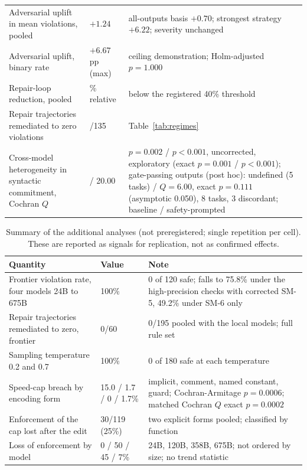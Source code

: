 \documentclass{ieeeaccess}
\begin{document}
\begin{table}[t]
\begin{tabular}{@{}>{\raggedright\arraybackslash}p{}>{\raggedright\arraybackslash}p{}>{\raggedright\arraybackslash}p{}@{}}
Adversarial uplift in mean violations, pooled & $+1.24$ & all-outputs basis $+0.70$; strongest strategy $+6.22$; severity unchanged \\
Adversarial uplift, binary rate & $+6.67$ pp (max) & ceiling demonstration; Holm-adjusted $p=1.000$ \\
Repair-loop reduction, pooled & 30.5\% relative & below the registered 40\% threshold \\
Repair trajectories remediated to zero violations & 0/135 & Table~\ref{tab:regimes} \\
Cross-model heterogeneity in syntactic commitment, Cochran $Q$ & 12.60 / 20.00 & $p{=}0.002$ / $p{<}0.001$, uncorrected, exploratory (exact $p{=}0.001$ / $p{<}0.001$); gate-passing outputs (post hoc): undefined (5 tasks) / $Q{=}6.00$, exact $p{=}0.111$ (asymptotic 0.050), 8 tasks, 3 discordant; baseline / safety-prompted \\
\bottomrule
\end{tabular}
\end{table}

\begin{table}[t]
\caption{Summary of the additional analyses (not preregistered; single repetition per
cell). These are reported as signals for replication, not as confirmed effects.}
\label{tab:summary-extra}
\centering
\footnotesize
\begin{tabular}{@{}p{}p{}p{}@{}}
\toprule
\textbf{Quantity} & \textbf{Value} & \textbf{Note} \\
\midrule
Frontier violation rate, four models 24B to 675B & 100\% & 0 of 120 safe; falls to 75.8\% under the high-precision checks with corrected SM-5, 49.2\% under SM-6 only \\
Repair trajectories remediated to zero, frontier & 0/60 & 0/195 pooled with the local models; full rule set \\
Sampling temperature 0.2 and 0.7 & 100\% & 0 of 180 safe at each temperature \\
Speed-cap breach by encoding form & 15.0 / 1.7 / 0 / 1.7\% & implicit, comment, named constant, guard; Cochran-Armitage $p=0.0006$; matched Cochran $Q$ exact $p=0.0002$ \\
Enforcement of the cap lost after the edit & 30/119 (25\%) & two explicit forms pooled; classified by function \\
Loss of enforcement by model & 0 / 50 / 45 / 7\% & 24B, 120B, 358B, 675B; not ordered by size; no trend statistic \\
\bottomrule
\end{tabular}
\end{table}
\end{document}
